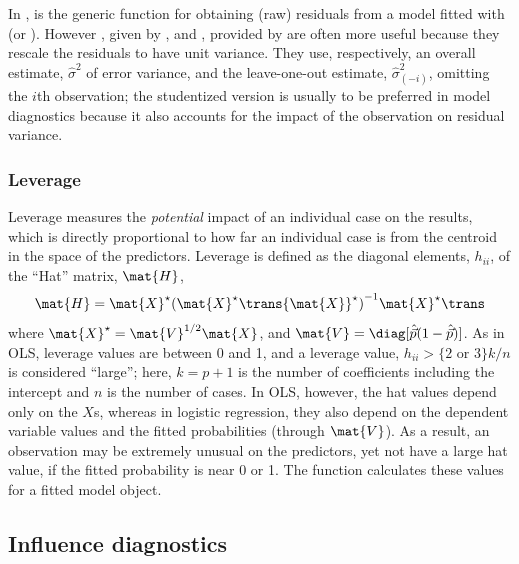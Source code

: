 \documentclass[11pt]{book}
\begin{document}
In \R,  is the generic function for obtaining (raw) residuals from
a model fitted with  (or ). However ,
given by , and
 ,
provided by  are often more useful
because they rescale the residuals to have unit variance.
They use, respectively, an overall estimate, $\hat{\sigma}^2$ of error variance, and the
leave-one-out estimate, $\hat{\sigma}_{(-i)}^2$, omitting the $i$th observation;
the studentized version is usually to be preferred in model diagnostics because
it also accounts for the impact of the observation on residual variance.


\subsubsection{Leverage}
Leverage measures the \emph{potential} impact of an individual case
on the results, which is directly proportional to how far an
individual case is from the centroid in the space of the
predictors.  Leverage is defined as the diagonal elements,
\(h_{ii}\), of the ``Hat'' matrix, \(\mat{H}\),
\begin{equation*}%
\mat{H} = {\mat{X}}^\star
{( {\mat{X}^\star}\trans {\mat{X}}^\star )}^{-1} {\mat{X}^\star}\trans
\end{equation*}
where \({\mat{X}} ^\star = {\mat{V}}^{1/2} \mat{X}\), and \(\mat{V}  =
\diag [ \hat{\vec{p}} ( 1 - \hat{\vec{p}})] \).  As in OLS,
leverage values are between 0 and 1, and a leverage value,
\(h_{ii}  > \{2 \mbox{ or } 3 \} k /  n\) is considered ``large''; here, \(k=p+1\) is the
number of coefficients including the intercept and \(n\) is the number of cases. 
In OLS, however, the hat values depend only on the $X$s, whereas
in logistic regression, they also depend on the dependent
variable values and the fitted probabilities (through $\mat{V}$).
As a result, an observation may be extremely unusual on the predictors,
yet not have a large hat value, if the fitted probability is near 0 or 1.
The function  calculates these values for a fitted
 model object.


\subsection{Influence diagnostics}\label{sec:logist-infldiag}
\end{document}
